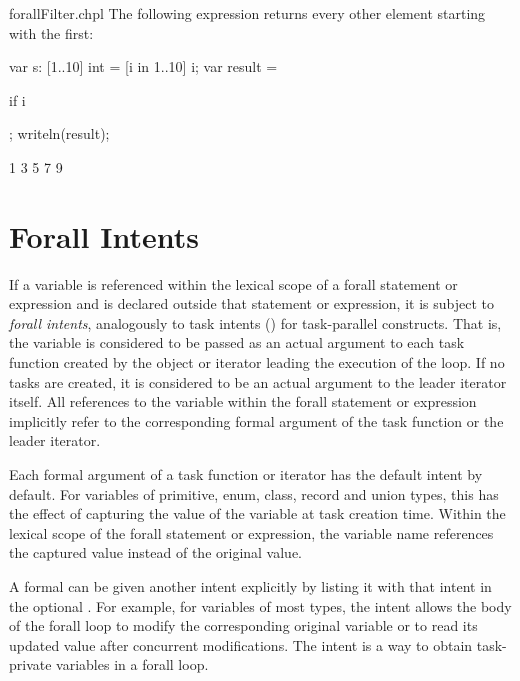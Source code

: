 \begin{chapelexample}{forallFilter.chpl}
The following expression returns every other element starting with the
first:
\begin{chapelpre}
var s: [1..10] int = [i in 1..10] i;
var result =
\end{chapelpre}
\begin{chapel}
[i in 1..s.numElements] if i %
\end{chapel}
\begin{chapelpost}
;
writeln(result);
\end{chapelpost}
\begin{chapeloutput}
1 3 5 7 9
\end{chapeloutput}
\end{chapelexample}


\section{Forall Intents}
\label{Forall_Intents}

If a variable is referenced within the lexical scope of a
forall statement or expression and is declared outside
that statement or expression, it is subject to \emph{forall intents},
analogously to task intents ()
for task-parallel constructs. That is, the variable is considered
to be passed as an actual argument to
each task function created by the object or iterator leading
the execution of the loop. If no tasks are created,
it is considered to be an actual argument to the leader
iterator itself. All references to the variable
within the forall statement or expression implicitly refer
to the corresponding formal argument of the task function
or the leader iterator.

Each formal argument of a task function or iterator has the default
intent by default.  For variables of primitive, enum, class, record
and union types, this has the effect of capturing the value of the
variable at task creation time.  Within the lexical scope of the
forall statement or expression, the variable name references the
captured value instead of the original value.

A formal can be given another intent explicitly by listing it
with that intent in the optional .
For example, for variables of most types, the  intent allows
the body of the forall loop to modify the corresponding original
variable or to read its updated value after concurrent modifications.
The  intent is a way to obtain task-private variables
in a forall loop.

